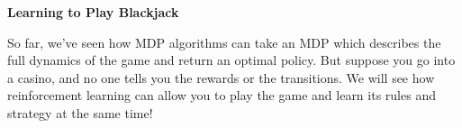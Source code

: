 \item {\bf Learning to Play Blackjack}

So far, we've seen how MDP algorithms can take an MDP which describes the full
dynamics of the game and return an optimal policy.  But suppose you go into a
casino, and no one tells you the rewards or the transitions. We will see how
reinforcement learning can allow you to play the game and learn its rules and
strategy at the same time!

\begin{enumerate}

  

  

  

  

\end{enumerate}
